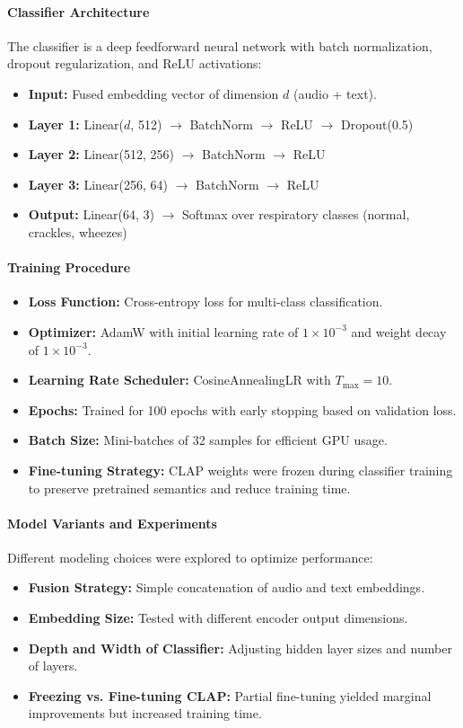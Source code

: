 \paragraph{Classifier Architecture}
The classifier is a deep feedforward neural network with batch normalization, dropout regularization, and ReLU activations:
\begin{itemize}
    \item \textbf{Input:} Fused embedding vector of dimension $d$ (audio + text).
    \item \textbf{Layer 1:} Linear($d$, 512) $\rightarrow$ BatchNorm $\rightarrow$ ReLU $\rightarrow$ Dropout(0.5)
    \item \textbf{Layer 2:} Linear(512, 256) $\rightarrow$ BatchNorm $\rightarrow$ ReLU
    \item \textbf{Layer 3:} Linear(256, 64) $\rightarrow$ BatchNorm $\rightarrow$ ReLU
    \item \textbf{Output:} Linear(64, 3) $\rightarrow$ Softmax over respiratory classes (normal, crackles, wheezes)
\end{itemize}

\paragraph{Training Procedure}
\begin{itemize}
    \item \textbf{Loss Function:} Cross-entropy loss for multi-class classification.
    \item \textbf{Optimizer:} AdamW with initial learning rate of $1 \times 10^{-3}$ and weight decay of $1 \times 10^{-3}$.
    \item \textbf{Learning Rate Scheduler:} CosineAnnealingLR with $T_{\text{max}} = 10$.
    \item \textbf{Epochs:} Trained for 100 epochs with early stopping based on validation loss.
    \item \textbf{Batch Size:} Mini-batches of 32 samples for efficient GPU usage.
    \item \textbf{Fine-tuning Strategy:} CLAP weights were frozen during classifier training to preserve pretrained semantics and reduce training time.
\end{itemize}

\paragraph{Model Variants and Experiments}
Different modeling choices were explored to optimize performance:
\begin{itemize}
    \item \textbf{Fusion Strategy:} Simple concatenation of audio and text embeddings.
    \item \textbf{Embedding Size:} Tested with different encoder output dimensions.
    \item \textbf{Depth and Width of Classifier:} Adjusting hidden layer sizes and number of layers.
    \item \textbf{Freezing vs. Fine-tuning CLAP:} Partial fine-tuning yielded marginal improvements but increased training time.
\end{itemize}


